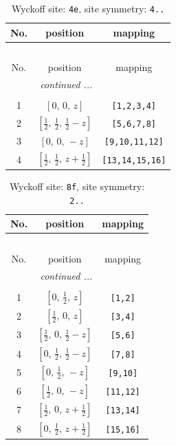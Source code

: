 \documentclass[fleqn,8pt]{jsarticle}
\begin{document}
\renewcommand{\arraystretch}{1.2}
\begin{longtable}{ccc}
\caption{Wyckoff site: {\tt 4e}, site symmetry: {\tt 4..}}
 \\
 \hline \hline
No. & position & mapping \\ \hline \endfirsthead

\multicolumn{2}{l}{\tablename\ \thetable{}} \\
 \hline \hline
No. & position & mapping \\ \hline \endhead

 \hline \hline
\multicolumn{2}{r}{\footnotesize\it continued ...} \\ \endfoot

 \hline \hline
\multicolumn{2}{r}{} \\ \endlastfoot

1 & $\left[ 0,\, 0,\, z \right]$ & {\tt [1,2,3,4]} \\ \hline
2 & $\left[ \frac{1}{2},\, \frac{1}{2},\, \frac{1}{2} - z \right]$ & {\tt [5,6,7,8]} \\ \hline
3 & $\left[ 0,\, 0,\, - z \right]$ & {\tt [9,10,11,12]} \\ \hline
4 & $\left[ \frac{1}{2},\, \frac{1}{2},\, z + \frac{1}{2} \right]$ & {\tt [13,14,15,16]} \\
\end{longtable}
\renewcommand{\arraystretch}{1.2}
\begin{longtable}{ccc}
\caption{Wyckoff site: {\tt 8f}, site symmetry: {\tt 2..}}
 \\
 \hline \hline
No. & position & mapping \\ \hline \endfirsthead

\multicolumn{2}{l}{\tablename\ \thetable{}} \\
 \hline \hline
No. & position & mapping \\ \hline \endhead

 \hline \hline
\multicolumn{2}{r}{\footnotesize\it continued ...} \\ \endfoot

 \hline \hline
\multicolumn{2}{r}{} \\ \endlastfoot

1 & $\left[ 0,\, \frac{1}{2},\, z \right]$ & {\tt [1,2]} \\ \hline
2 & $\left[ \frac{1}{2},\, 0,\, z \right]$ & {\tt [3,4]} \\ \hline
3 & $\left[ \frac{1}{2},\, 0,\, \frac{1}{2} - z \right]$ & {\tt [5,6]} \\ \hline
4 & $\left[ 0,\, \frac{1}{2},\, \frac{1}{2} - z \right]$ & {\tt [7,8]} \\ \hline
5 & $\left[ 0,\, \frac{1}{2},\, - z \right]$ & {\tt [9,10]} \\ \hline
6 & $\left[ \frac{1}{2},\, 0,\, - z \right]$ & {\tt [11,12]} \\ \hline
7 & $\left[ \frac{1}{2},\, 0,\, z + \frac{1}{2} \right]$ & {\tt [13,14]} \\ \hline
8 & $\left[ 0,\, \frac{1}{2},\, z + \frac{1}{2} \right]$ & {\tt [15,16]} \\
\end{longtable}
\end{document}
